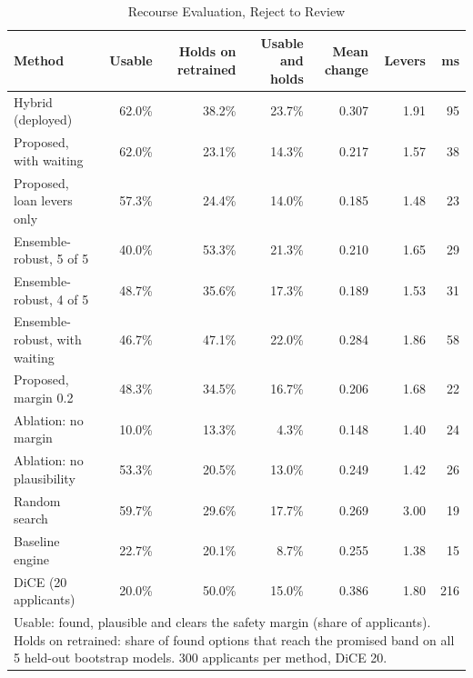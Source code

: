 \begin{table}[t]
\caption{Recourse Evaluation, Reject to Review}
\label{tab:recourse_reject_to_review}
\centering
\setlength{\tabcolsep}{4pt}
\begin{tabular}{lrrrrrr}
\hline
\textbf{Method} & \textbf{Usable} & \textbf{Holds on retrained} & \textbf{Usable and holds} & \textbf{Mean change} & \textbf{Levers} & \textbf{ms} \\
\hline
Hybrid (deployed) & 62.0\% & 38.2\% & 23.7\% & 0.307 & 1.91 & 95 \\
Proposed, with waiting & 62.0\% & 23.1\% & 14.3\% & 0.217 & 1.57 & 38 \\
Proposed, loan levers only & 57.3\% & 24.4\% & 14.0\% & 0.185 & 1.48 & 23 \\
Ensemble-robust, 5 of 5 & 40.0\% & 53.3\% & 21.3\% & 0.210 & 1.65 & 29 \\
Ensemble-robust, 4 of 5 & 48.7\% & 35.6\% & 17.3\% & 0.189 & 1.53 & 31 \\
Ensemble-robust, with waiting & 46.7\% & 47.1\% & 22.0\% & 0.284 & 1.86 & 58 \\
Proposed, margin 0.2 & 48.3\% & 34.5\% & 16.7\% & 0.206 & 1.68 & 22 \\
Ablation: no margin & 10.0\% & 13.3\% & 4.3\% & 0.148 & 1.40 & 24 \\
Ablation: no plausibility & 53.3\% & 20.5\% & 13.0\% & 0.249 & 1.42 & 26 \\
Random search & 59.7\% & 29.6\% & 17.7\% & 0.269 & 3.00 & 19 \\
Baseline engine & 22.7\% & 20.1\% & 8.7\% & 0.255 & 1.38 & 15 \\
DiCE (20 applicants) & 20.0\% & 50.0\% & 15.0\% & 0.386 & 1.80 & 216 \\
\hline
\multicolumn{7}{p{0.95\linewidth}}{\footnotesize Usable: found, plausible and clears the safety margin (share of applicants). Holds on retrained: share of found options that reach the promised band on all 5 held-out bootstrap models. 300 applicants per method, DiCE 20.} \\
\end{tabular}
\end{table}
